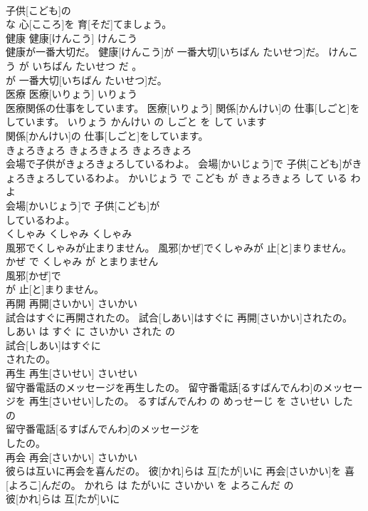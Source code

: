 \documentclass[8pt]{extreport}
\begin{document}
\begin{CJK}{UTF8}{min}
\\	子供[こども]の
\\	な 心[こころ]を 育[そだ]てましょう。			
\\	健康	健康[けんこう]	けんこう	
\\	健康が一番大切だ。	健康[けんこう]が 一番大切[いちばん たいせつ]だ。	けんこう が いちばん たいせつ だ 。	
\\	が 一番大切[いちばん たいせつ]だ。			
\\	医療	医療[いりょう]	いりょう	
\\	医療関係の仕事をしています。	医療[いりょう] 関係[かんけい]の 仕事[しごと]をしています。	いりょう かんけい の しごと を して います	
\\	関係[かんけい]の 仕事[しごと]をしています。			
\\	きょろきょろ	きょろきょろ	きょろきょろ	
\\	会場で子供がきょろきょろしているわよ。	会場[かいじょう]で 子供[こども]がきょろきょろしているわよ。	かいじょう で こども が きょろきょろ して いる わ よ	
\\	会場[かいじょう]で 子供[こども]が
\\	しているわよ。			
\\	くしゃみ	くしゃみ	くしゃみ	
\\	風邪でくしゃみが止まりません。	風邪[かぜ]でくしゃみが 止[と]まりません。	かぜ で くしゃみ が とまりません	
\\	風邪[かぜ]で
\\	が 止[と]まりません。			
\\	再開	再開[さいかい]	さいかい	
\\	試合はすぐに再開されたの。	試合[しあい]はすぐに 再開[さいかい]されたの。	しあい は すぐ に さいかい された の	
\\	試合[しあい]はすぐに
\\	されたの。			
\\	再生	再生[さいせい]	さいせい	
\\	留守番電話のメッセージを再生したの。	留守番電話[るすばんでんわ]のメッセージを 再生[さいせい]したの。	るすばんでんわ の めっせーじ を さいせい した の	
\\	留守番電話[るすばんでんわ]のメッセージを
\\	したの。			
\\	再会	再会[さいかい]	さいかい	
\\	彼らは互いに再会を喜んだの。	彼[かれ]らは 互[たが]いに 再会[さいかい]を 喜[よろこ]んだの。	かれら は たがいに さいかい を よろこんだ の	
\\	彼[かれ]らは 互[たが]いに

\end{CJK}
\end{document}
